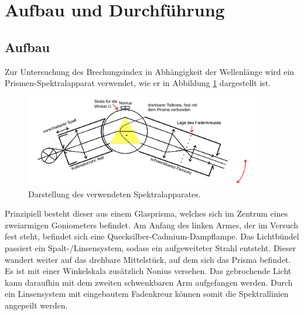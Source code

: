 \section{Aufbau und Durchführung}
\subsection{Aufbau}
\label{sec:Aufbau}
Zur Untersuchung des Brechungsindex in Abhängigkeit der Wellenlänge wird ein Prismen-Spektralapparat verwendet, wie er in Abbildung \ref{fig:1} dargestellt ist.

\begin{figure}[H]
  \centering
  \includegraphics[height=4cm]{ressources/aufbau.png}
  \caption{Darstellung des verwendeten Spektralapparates. \cite{skript}}
  \label{fig:1}
\end{figure}

Prinzipiell besteht dieser aus einem Glasprisma, welches sich im Zentrum eines zweiarmigen Goniometers befindet.
Am Anfang des linken Armes, der im Versuch fest steht, befindet sich eine Quecksilber-Cadmium-Dampflampe.
Das Lichtbündel passiert ein Spalt-/Linsensystem, sodass ein aufgeweiteter Strahl entsteht.
Dieser wandert weiter auf das drehbare Mittelstück, auf dem sich das Prisma befindet.
Es ist mit einer Winkelskala zusätzlich Nonius versehen.
Das gebrochende Licht kann daraufhin mit dem zweiten schwenkbaren Arm aufgefangen werden.
Durch ein Linsensystem mit eingebautem Fadenkreuz können somit die Spektrallinien angepeilt werden.
